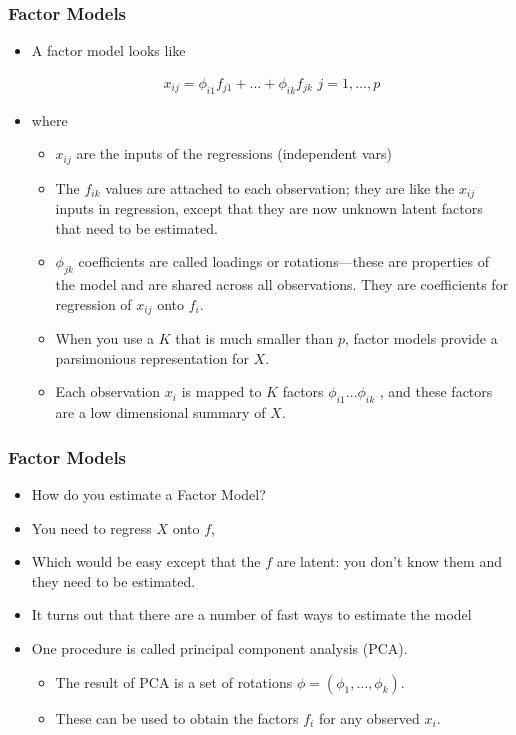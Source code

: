 \documentclass[
  shownotes,
  xcolor={svgnames},
  hyperref={colorlinks,citecolor=DarkBlue,linkcolor=DarkRed,urlcolor=DarkBlue}
  , aspectratio=169]{beamer}
\begin{document}
\begin{frame}
\frametitle{Factor Models}

\begin{itemize}
\item A factor model looks like 

\begin{align}
x_{ij}=  \phi_{i1} f_{j1} + \dots + \phi_{ik} f_{jk} \,\, j=1,\dots,p
\end{align}

\item where 
  \begin{itemize}
   \item $x_{ij}$ are the inputs of the regressions (independent vars)
   \medskip
   \item The $f_{ik}$ values are attached to each observation; they are like the $x_{ij}$ inputs in regression, except that they are now unknown latent factors that need to be estimated.
  \medskip
   \item $\phi_{jk}$ coefficients are called loadings or rotations—these are properties of the model and are shared across all observations. They are coefficients for regression of $x_{ij}$ onto $f_i$.
  \medskip
   \item When you use a $K$ that is much smaller than $p$, factor models provide a parsimonious representation for $X$. 
   \medskip
   \item Each observation $x_i$ is mapped to $K$ factors $\phi_{i1} \dots \phi_{ik}$ , and these factors are a low dimensional summary of $X$.
  \end{itemize}


\end{itemize}
\end{frame}
\begin{frame}
\frametitle{Factor Models}

\begin{itemize}
\item How do you estimate a Factor Model?
\medskip
\item You need to regress $X$ onto $f$, 
\medskip
\pause
\item Which would be easy except that the $f$ are latent: you don’t know them and they need to be estimated. 
\medskip
\item It turns out that there are a number of fast ways to estimate the model
\medskip
\item One procedure is called principal component analysis (PCA). 
\medskip
\begin{itemize}
  \item The result of PCA is a set of rotations $\phi=(\phi_1,\dots,\phi_k)$. 
    \medskip
  \item These can be used to obtain the factors $f_i$ for any observed $x_i$.
\end{itemize}


\end{itemize}


\end{frame}
\end{document}
